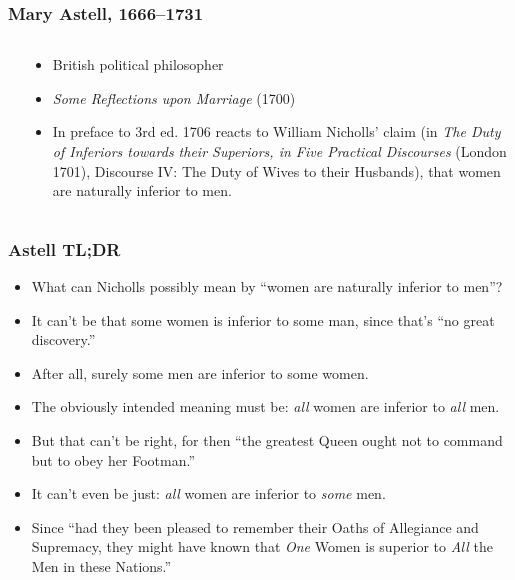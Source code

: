 \begin{frame}
    \frametitle{Mary Astell, 1666--1731}

\begin{columns}
\begin{column}{3cm}
\end{column}
\begin{column}{7cm}
\begin{itemize}
\item British political philosopher
\item \textit{Some Reflections upon Marriage} (1700)
\item In preface to 3rd ed. 1706 reacts to William Nicholls' claim (in \textit{The Duty of Inferiors
towards their Superiors, in Five Practical Discourses} (London 1701), Discourse IV: The Duty of Wives to their
Husbands), that women are naturally inferior to men.
\end{itemize}
\end{column}
\end{columns}
\end{frame}



\begin{frame}
    \frametitle{Astell TL;DR}

\begin{itemize}
  \item What can Nicholls possibly mean by ``women are naturally inferior to men''?
  \item It can't be that some women is inferior to some man, since
  that's ``no great discovery.''
  \item After all, surely some men are inferior to some women.
  \item The obviously intended meaning must be: \emph{all} women are
  inferior to \emph{all} men.
  \item But that can't be right, for then ``the greatest Queen ought
  not to command but to obey her Footman.''
  \item It can't even be just: \emph{all} women are inferior to
  \emph{some} men.
  \item Since ``had they been pleased to remember their Oaths of
  Allegiance and Supremacy, they might have known that \textit{One}
  Women is superior to \textit{All} the Men in these Nations.''
\end{itemize}

\end{frame}

